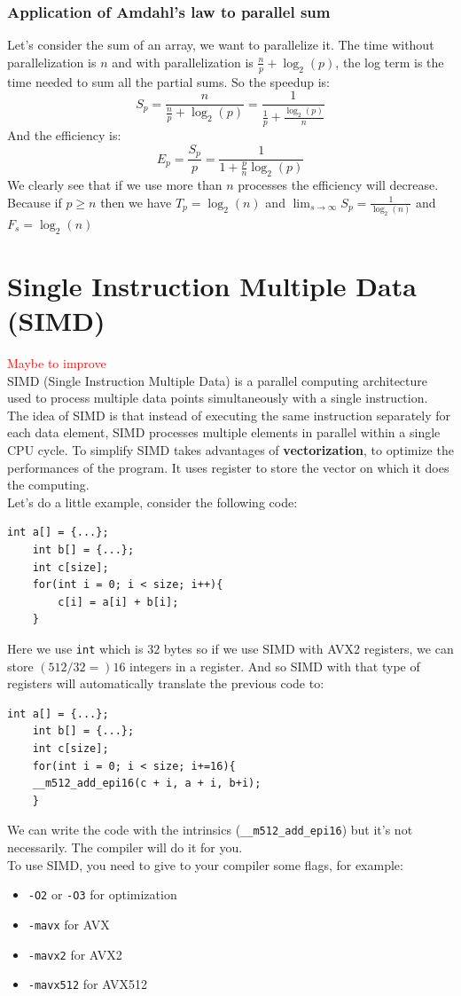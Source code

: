 \documentclass[12pt, openany]{report}
\theoremstyle{definition}
\newcommand{\code}[1]{\colorbox{light-gray}{\texttt{#1}}}
\begin{document}
\subsection{Application of Amdahl's law to parallel sum}
Let's consider the sum of an array, we want to parallelize it. The time without parallelization is $n$ and with parallelization is $\frac{n}{p} + \log_2(p)$, the log term is the time needed to sum all the partial sums. So the speedup is:
\begin{equation}
	S_p = \frac{n}{\frac{n}{p} + \log_2(p)} = \frac{1}{\frac{1}{p} + \frac{\log_2(p)}{n}}
\end{equation}
And the efficiency is:
\begin{equation}
	E_p = \frac{S_p}{p} = \frac{1}{1 + \frac{p}{n}\log_2(p)}
\end{equation}
We clearly see that if we use more than $n$ processes the efficiency will decrease. Because if $p \geq n$ then we have $T_p = \log_2(n)$ and $\lim_{s \to \infty} S_p = \frac{1}{\log_2(n)}$ and $F_s = \log_2(n)$
\chapter{Single Instruction Multiple Data (SIMD)}
\textcolor{red}{Maybe to improve}\\
SIMD (Single Instruction Multiple Data) is a parallel computing architecture used to process multiple data points simultaneously with a single instruction.\\
The idea of SIMD is that instead of executing the same instruction separately for each data element, SIMD processes multiple elements in parallel within a single CPU cycle. To simplify SIMD takes advantages of \textbf{vectorization}, to optimize the performances of the program. It uses register to store the vector on which it does the computing.\\
Let's do a little example, consider the following code:
\begin{lstlisting}[style=CppStyle]
	int a[] = {...};
	int b[] = {...};
	int c[size];
	for(int i = 0; i < size; i++){
		c[i] = a[i] + b[i];
	}
\end{lstlisting}
Here we use \texttt{int} which is $32$ bytes so if we use SIMD with AVX2 registers, we can store $(512/32 =) 16$ integers in a register. And so SIMD with that type of registers will automatically translate the previous code to:
\begin{lstlisting}[style=CppStyle]
	int a[] = {...};
	int b[] = {...};
	int c[size];
	for(int i = 0; i < size; i+=16){
    __m512_add_epi16(c + i, a + i, b+i);
	}
\end{lstlisting}
We can write the code with the intrinsics (\code{\_\_m512\_add\_epi16}) but it's not necessarily. The compiler will do it for you.\\
To use SIMD, you need to give to your compiler some flags, for example:
\begin{itemize}
	\item \code{-O2} or \code{-O3} for optimization
	\item \code{-mavx} for AVX
	\item \code{-mavx2} for AVX2
	\item \code{-mavx512} for AVX512
\end{itemize}
\end{document}
